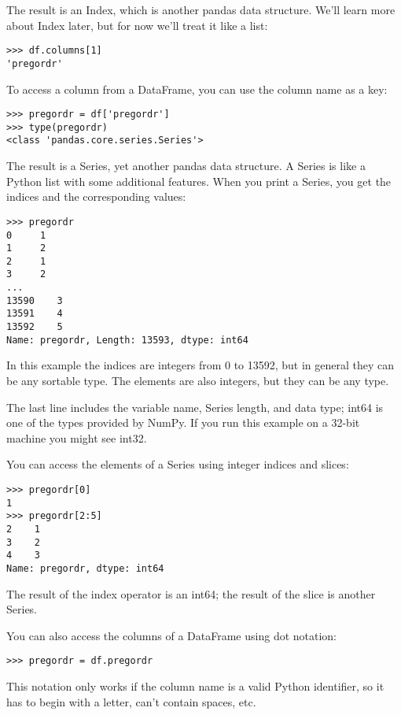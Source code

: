 \documentclass[]{book}
\begin{document}
The result is an Index, which is another
pandas data structure. We'll learn more about Index later, but for now
we'll treat it like a list:

\begin{verbatim}
>>> df.columns[1]
'pregordr'
\end{verbatim}

To access a column from a DataFrame, you
can use the column name as a key:

\begin{verbatim}
>>> pregordr = df['pregordr']
>>> type(pregordr)
<class 'pandas.core.series.Series'>
\end{verbatim}

The result is a Series, yet another
pandas data structure. A Series is like a Python list with some
additional features. When you print a Series, you get the indices and
the corresponding values:

\begin{verbatim}
>>> pregordr
0     1
1     2
2     1
3     2
...
13590    3
13591    4
13592    5
Name: pregordr, Length: 13593, dtype: int64
\end{verbatim}

In this example the indices are integers
from 0 to 13592, but in general they can be any sortable type. The
elements are also integers, but they can be any type.

The last line includes the variable name,
Series length, and data type; int64 is one of the types provided
by NumPy. If you run this example on a 32-bit machine you might see
int32.

You can access the elements of a Series
using integer indices and slices:

\begin{verbatim}
>>> pregordr[0]
1
>>> pregordr[2:5]
2    1
3    2
4    3
Name: pregordr, dtype: int64
\end{verbatim}

The result of the index operator is an
int64; the result of the
slice is another Series.

You can also access the columns of a
DataFrame using dot notation:

\begin{verbatim}
>>> pregordr = df.pregordr
\end{verbatim}

This notation only works if the column
name is a valid Python identifier, so it has to begin with a letter,
can't contain spaces, etc.
\end{document}
